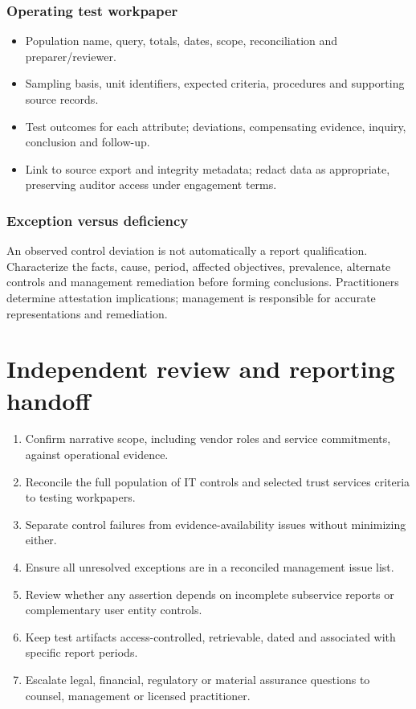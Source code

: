 \documentclass[10pt,oneside]{report}
\begin{document}
\subsection{Operating test workpaper}
\begin{itemize}
\item Population name, query, totals, dates, scope, reconciliation and preparer/reviewer.
\item Sampling basis, unit identifiers, expected criteria, procedures and supporting source records.
\item Test outcomes for each attribute; deviations, compensating evidence, inquiry, conclusion and follow-up.
\item Link to source export and integrity metadata; redact data as appropriate, preserving auditor access under engagement terms.
\end{itemize}

\subsection{Exception versus deficiency}
An observed control deviation is not automatically a report qualification. Characterize the facts, cause, period, affected objectives, prevalence, alternate controls and management remediation before forming conclusions. Practitioners determine attestation implications; management is responsible for accurate representations and remediation.

\chapter{Independent review and reporting handoff}
\begin{enumerate}
\item Confirm narrative scope, including vendor roles and service commitments, against operational evidence.
\item Reconcile the full population of IT controls and selected trust services criteria to testing workpapers.
\item Separate control failures from evidence-availability issues without minimizing either.
\item Ensure all unresolved exceptions are in a reconciled management issue list.
\item Review whether any assertion depends on incomplete subservice reports or complementary user entity controls.
\item Keep test artifacts access-controlled, retrievable, dated and associated with specific report periods.
\item Escalate legal, financial, regulatory or material assurance questions to counsel, management or licensed practitioner.
\end{enumerate}
\end{document}
